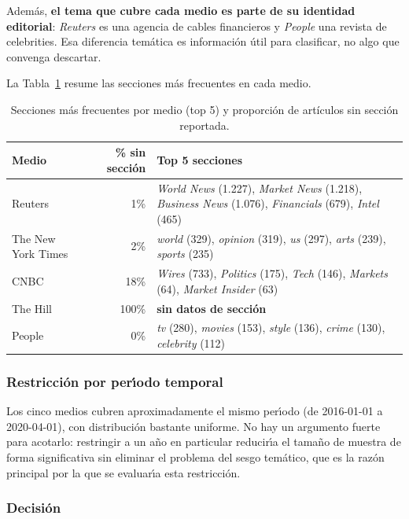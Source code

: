 \documentclass[11pt,a4paper]{article}
\begin{document}
Adem\'{a}s, \textbf{el tema que cubre cada medio es parte de su identidad editorial}: \textit{Reuters} es una agencia de cables financieros y \textit{People} una revista de celebrities. Esa diferencia tem\'{a}tica es informaci\'{o}n \'{u}til para clasificar, no algo que convenga descartar.

La Tabla~\ref{tab:secciones} resume las secciones m\'{a}s frecuentes en cada medio.

\begin{table}[H]
\centering\small
\caption{Secciones m\'as frecuentes por medio (top 5) y proporci\'on de art\'iculos sin secci\'on reportada.}
\label{tab:secciones}
\begin{tabularx}{\textwidth}{l r X}
\toprule
\textbf{Medio} & \textbf{\% sin secci\'on} & \textbf{Top 5 secciones} \\
\midrule
Reuters & 1\% & \textit{World News} (1.227), \textit{Market News} (1.218), \textit{Business News} (1.076), \textit{Financials} (679), \textit{Intel} (465) \\
The New York Times & 2\% & \textit{world} (329), \textit{opinion} (319), \textit{us} (297), \textit{arts} (239), \textit{sports} (235) \\
CNBC & 18\% & \textit{Wires} (733), \textit{Politics} (175), \textit{Tech} (146), \textit{Markets} (64), \textit{Market Insider} (63) \\
The Hill & 100\% & \textbf{sin datos de secci\'on} \\
People & 0\% & \textit{tv} (280), \textit{movies} (153), \textit{style} (136), \textit{crime} (130), \textit{celebrity} (112) \\
\bottomrule
\end{tabularx}
\end{table}

\subsubsection*{Restricci\'{o}n por per\'{\i}odo temporal}

Los cinco medios cubren aproximadamente el mismo per\'{\i}odo (de 2016-01-01 a 2020-04-01), con distribuci\'{o}n bastante uniforme. No hay un argumento fuerte para acotarlo: restringir a un a\~{n}o en particular reducir\'{\i}a el tama\~{n}o de muestra de forma significativa sin eliminar el problema del sesgo tem\'{a}tico, que es la raz\'{o}n principal por la que se evaluar\'{\i}a esta restricci\'{o}n.

\subsubsection*{Decisi\'{o}n}
\end{document}
